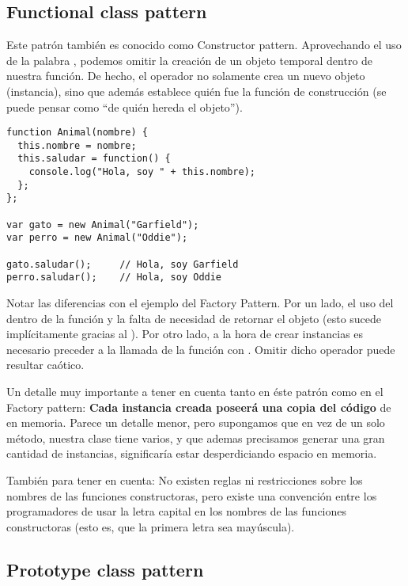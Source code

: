 \subsection{Functional class pattern}

Este patrón también es conocido como Constructor pattern. Aprovechando el uso de la palabra , podemos omitir la creación de un objeto temporal dentro de nuestra función. De hecho, el operador  no solamente crea un nuevo objeto (instancia), sino que además establece quién fue la función de construcción (se puede pensar como "`de quién hereda el objeto"').

\begin{lstlisting}[title={Functional class pattern}]
function Animal(nombre) {
  this.nombre = nombre;
  this.saludar = function() {
    console.log("Hola, soy " + this.nombre);
  };
};

var gato = new Animal("Garfield");
var perro = new Animal("Oddie");

gato.saludar();		// Hola, soy Garfield
perro.saludar();	// Hola, soy Oddie
\end{lstlisting}

Notar las diferencias con el ejemplo del Factory Pattern. Por un lado, el uso del  dentro de la función y la falta de necesidad de retornar el objeto (esto sucede implícitamente gracias al ). Por otro lado, a la hora de crear instancias es necesario preceder a la llamada de la función con . Omitir dicho operador puede resultar caótico.

Un detalle muy importante a tener en cuenta tanto en éste patrón como en el Factory pattern: \textbf{Cada instancia creada poseerá una copia del código} de  en memoria. Parece un detalle menor, pero supongamos que en vez de un solo método, nuestra clase tiene varios, y que ademas precisamos generar una gran cantidad de instancias, significaría estar desperdiciando espacio en memoria.

También para tener en cuenta: No existen reglas ni restricciones sobre los nombres de las funciones constructoras, pero existe una convención entre los programadores de usar la letra capital en los nombres de las funciones constructoras (esto es, que la primera letra sea mayúscula).

\subsection{Prototype class pattern}

